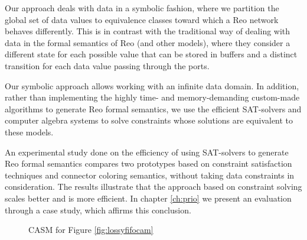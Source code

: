 Our approach deals with data in a symbolic fashion, where we partition the global set of data values to equivalence classes toward which a Reo network behaves differently. This is in contrast with the traditional way of dealing with data in the formal semantics of Reo (and other models), where they consider a different state for each possible value that can be stored in buffers and a distinct transition for each data value passing through the ports. 

Our symbolic approach allows working with an infinite data domain. In addition, rather than implementing the highly time- and memory-demanding custom-made algorithms to generate Reo formal semantics, we use the efficient SAT-solvers and computer algebra systems to solve constraints whose solutions are equivalent to these models. 

An experimental study done on the efficiency of using SAT-solvers to generate Reo formal semantics \cite{JoseThesis} compares two prototypes based on constraint satisfaction techniques and connector coloring semantics, without taking data constraints in consideration. The results illustrate that the approach based on constraint solving scales better and is more efficient. In chapter \ref{ch:prio} we present an evaluation through a case study, which affirms this conclusion.


\begin{figure}[t]
 \centering
			\caption{CASM for Figure \ref{fig:lossyfifocam}}
			\label{fig:cccasma}
        \end{figure}    

